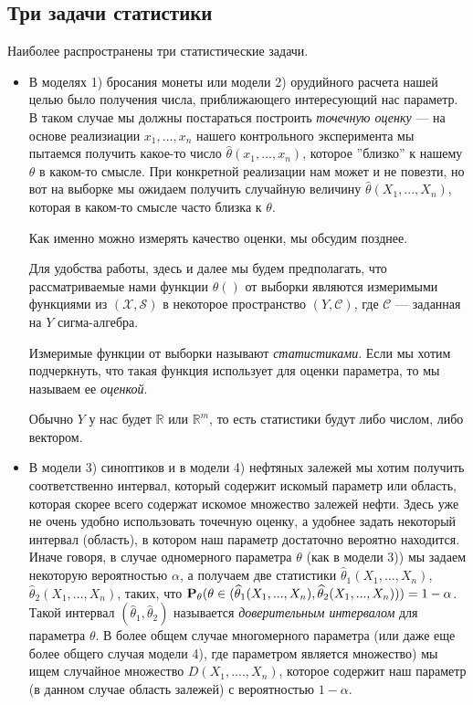 \documentclass[10 pt,russian]{article}
\begin{document}
\subsection{Три задачи статистики}
Наиболее распространены три статистические задачи. 
\begin{itemize}
\item В моделях 1) бросания монеты или модели 2) орудийного расчета нашей целью было получения числа, приближающего интересующий нас параметр. В таком случае мы  должны постараться построить {\it точечную оценку} --- на основе реализиации $x_1,...,x_n$ нашего контрольного эксперимента мы пытаемся получить какое-то число $\widehat{\theta}(x_1,...,x_n)$, которое ''близко'' к нашему $\theta$ в каком-то смысле. При конкретной реализации нам может и не повезти, но вот на выборке мы ожидаем получить случайную величину $\widehat{\theta}(X_1,...,X_n)$, которая в каком-то смысле часто близка к $\theta$.

Как именно можно измерять качество оценки, мы обсудим позднее. 

Для удобства работы, здесь и далее мы будем предполагать, что рассматриваемые нами функции $\widehat{\theta}()$ от выборки являются измеримыми функциями из $(\mathcal{X}, \mathcal{S})$ в некоторое пространство $(Y, \mathcal{C})$, где $\mathcal{C}$ --- заданная на $Y$ сигма-алгебра. 
\begin{Def} Измеримые функции от выборки называют {\it статистиками}. Если мы хотим подчеркнуть, что такая функция использует для оценки параметра, то мы называем ее {\it оценкой}.
\end{Def}
Обычно $Y$ у нас будет $\mathbb{R}$ или $\mathbb{R}^m$, то есть статистики будут либо числом, либо вектором.

\item В модели 3) синоптиков и в модели 4) нефтяных залежей мы хотим получить соответственно интервал, который содержит искомый параметр или область, которая скорее всего содержат искомое множество залежей нефти. Здесь уже не очень удобно использовать точечную оценку, а удобнее задать некоторый интервал (область), в котором наш параметр достаточно вероятно находится. Иначе говоря, в случае одномерного параметра $\theta$ (как в модели 3)) мы задаем некоторую вероятностью $\alpha$, а получаем две статистики $\widehat{\theta}_1(X_1,...,X_n)$, $\widehat{\theta}_2(X_1,...,X_n)$, таких, что 
${\bf P}_{\theta} (\theta\in (\widehat{\theta}_1(X_1,...,X_n),\widehat{\theta}_2(X_1,...,X_n)))=1-\alpha$. Такой интервал $(\widehat{\theta}_1,\widehat{\theta}_2)$ называется {\it доверительным интервалом} для параметра $\theta$. В более общем случае многомерного параметра (или даже еще более общего случая модели 4), где параметром является множество) мы ищем случайное множество $D(X_1,....,X_n)$, которое содержит наш параметр (в данном случае область залежей) с вероятностью $1-\alpha$.


\end{itemize}
\end{document}
